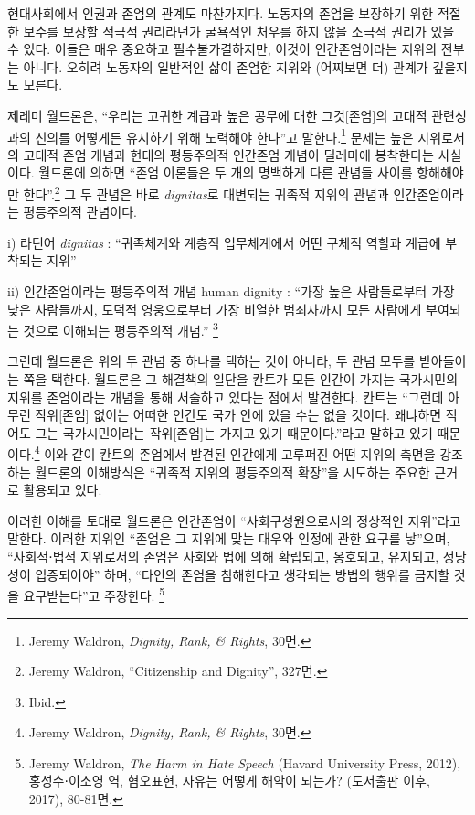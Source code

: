 현대사회에서 인권과 존엄의 관계도 마찬가지다. 노동자의 존엄을 보장하기 위한 적절한 보수를 보장할 적극적 권리라던가 굴욕적인 처우를 하지 않을 소극적 권리가 있을 수 있다. 이들은 매우 중요하고 필수불가결하지만, 이것이 인간존엄이라는 지위의 전부는 아니다. 오히려 노동자의 일반적인 삶이 존엄한 지위와 (어찌보면 더) 관계가 깊을지도 모른다.

제레미 월드론은, ``우리는 고귀한 계급과 높은 공무에 대한 그것{[}존엄{]}의 고대적 관련성과의 신의를 어떻게든 유지하기 위해 노력해야 한다''고 말한다.\footnote{Jeremy Waldron, \emph{Dignity, Rank, \& Rights}, 30면.} 문제는 높은 지위로서의 고대적 존엄 개념과 현대의 평등주의적 인간존엄 개념이 딜레마에 봉착한다는 사실이다. 월드론에 의하면 ``존엄 이론들은 두 개의 명백하게 다른 관념들 사이를 항해해야만 한다''.\footnote{Jeremy Waldron, ``Citizenship and Dignity'', 327면.} 그 두 관념은 바로 \emph{dignitas}로 대변되는 귀족적 지위의 관념과 인간존엄이라는 평등주의적 관념이다.

i) 라틴어 \emph{dignitas} : ``귀족체계와 계층적 업무체계에서 어떤 구체적 역할과 계급에 부착되는 지위''

ii) 인간존엄이라는 평등주의적 개념 human dignity : ``가장 높은 사람들로부터 가장 낮은 사람들까지, 도덕적 영웅으로부터 가장 비열한 범죄자까지 모든 사람에게 부여되는 것으로 이해되는 평등주의적 개념.'' \footnote{Ibid.}

그런데 월드론은 위의 두 관념 중 하나를 택하는 것이 아니라, 두 관념 모두를 받아들이는 쪽을 택한다. 월드론은 그 해결책의 일단을 칸트가 모든 인간이 가지는 국가시민의 지위를 존엄이라는 개념을 통해 서술하고 있다는 점에서 발견한다. 칸트는 ``그런데 아무런 작위{[}존엄{]} 없이는 어떠한 인간도 국가 안에 있을 수는 없을 것이다. 왜냐하면 적어도 그는 국가시민이라는 작위{[}존엄{]}는 가지고 있기 때문이다.''라고 말하고 있기 때문이다.\footnote{Jeremy Waldron, \emph{Dignity, Rank, \& Rights}, 30면.} 이와 같이 칸트의 존엄에서 발견된 인간에게 고루퍼진 어떤 지위의 측면을 강조하는 월드론의 이해방식은 ``귀족적 지위의 평등주의적 확장''을 시도하는 주요한 근거로 활용되고 있다.

이러한 이해를 토대로 월드론은 인간존엄이 ``사회구성원으로서의 정상적인 지위''라고 말한다. 이러한 지위인 ``존엄은 그 지위에 맞는 대우와 인정에 관한 요구를 낳''으며, ``사회적⋅법적 지위로서의 존엄은 사회와 법에 의해 확립되고, 옹호되고, 유지되고, 정당성이 입증되어야'' 하며, ``타인의 존엄을 침해한다고 생각되는 방법의 행위를 금지할 것을 요구받는다''고 주장한다. \footnote{Jeremy Waldron, \emph{The Harm in Hate Speech} (Havard University Press, 2012), 홍성수⋅이소영 역, 혐오표현, 자유는 어떻게 해악이 되는가? (도서출판 이후, 2017), 80-81면.}

